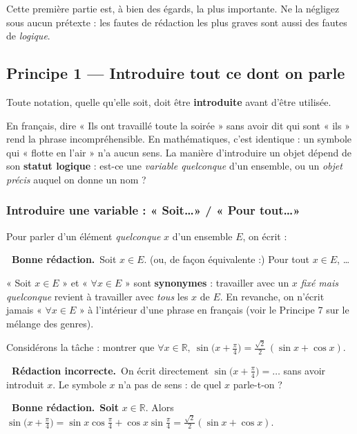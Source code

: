 \documentclass[11pt,a4paper]{article}
\newcommand{\ok}{\textcolor{METeal}{\textbf{\ding{51}\ \sffamily Bonne rédaction.}}\ }
\newcommand{\ko}{\textcolor{MECoral}{\textbf{\ding{55}\ \sffamily Rédaction incorrecte.}}\ }
\newcommand{\R}{\mathbb{R}}
\begin{document}
Cette première partie est, à bien des égards, la plus importante. Ne la négligez sous
aucun prétexte : les fautes de rédaction les plus graves sont aussi des fautes de
\emph{logique}.

\subsection{Principe 1 — Introduire tout ce dont on parle}

\begin{regle}
Toute notation, quelle qu'elle soit, doit être \textbf{introduite} avant d'être utilisée.
\end{regle}

En français, dire « Ils ont travaillé toute la soirée » sans avoir dit qui sont « ils »
rend la phrase incompréhensible. En mathématiques, c'est identique : un symbole qui
« flotte en l'air » n'a aucun sens. La manière d'introduire un objet dépend de son
\textbf{statut logique} : est-ce une \emph{variable quelconque} d'un ensemble, ou un
\emph{objet précis} auquel on donne un nom ?

\subsubsection{Introduire une variable : « Soit\dots » / « Pour tout\dots »}

Pour parler d'un élément \emph{quelconque} $x$ d'un ensemble $E$, on écrit :
\begin{bonne}
\ok Soit $x \in E$. \qquad(ou, de façon équivalente :) \qquad Pour tout $x \in E$, \dots
\end{bonne}

\begin{astuce}
« Soit $x\in E$ » et « $\forall x \in E$ » sont \textbf{synonymes} : travailler avec un $x$
\emph{fixé mais quelconque} revient à travailler avec \emph{tous} les $x$ de $E$. En revanche,
on n'écrit jamais « $\forall x\in E$ » à l'intérieur d'une phrase en français (voir le
Principe 7 sur le mélange des genres).
\end{astuce}

Considérons la tâche : montrer que $\displaystyle \forall x\in\R,\ \sin\!\Big(x+\tfrac{\pi}{4}\Big)
=\tfrac{\sqrt2}{2}\,(\sin x+\cos x)$.

\begin{mauvaise}
\ko On écrit directement $\sin\!\big(x+\tfrac{\pi}{4}\big)=\dots$ sans avoir introduit $x$.
Le symbole $x$ n'a pas de sens : de quel $x$ parle-t-on ?
\end{mauvaise}
\begin{bonne}
\ok \textbf{Soit} $x\in\R$. Alors
$\sin\!\big(x+\tfrac{\pi}{4}\big)=\sin x\cos\tfrac{\pi}{4}+\cos x\sin\tfrac{\pi}{4}
=\tfrac{\sqrt2}{2}(\sin x+\cos x).$
\end{bonne}
\end{document}
